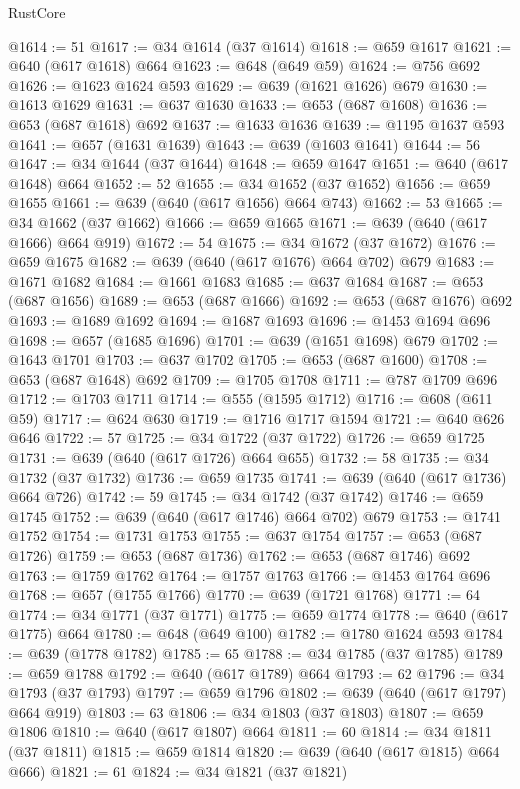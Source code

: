 \begin{lexlean}{RustCore}
\begin{coremodule}
@1614 := 51
@1617 := @34 @1614 (@37 @1614)
@1618 := @659 @1617
@1621 := @640 (@617 @1618) @664
@1623 := @648 (@649 @59)
@1624 := @756 @692
@1626 := @1623 @1624 @593
@1629 := @639 (@1621 @1626) @679
@1630 := @1613 @1629
@1631 := @637 @1630
@1633 := @653 (@687 @1608)
@1636 := @653 (@687 @1618) @692
@1637 := @1633 @1636
@1639 := @1195 @1637 @593
@1641 := @657 (@1631 @1639)
@1643 := @639 (@1603 @1641)
@1644 := 56
@1647 := @34 @1644 (@37 @1644)
@1648 := @659 @1647
@1651 := @640 (@617 @1648) @664
@1652 := 52
@1655 := @34 @1652 (@37 @1652)
@1656 := @659 @1655
@1661 := @639 (@640 (@617 @1656) @664 @743)
@1662 := 53
@1665 := @34 @1662 (@37 @1662)
@1666 := @659 @1665
@1671 := @639 (@640 (@617 @1666) @664 @919)
@1672 := 54
@1675 := @34 @1672 (@37 @1672)
@1676 := @659 @1675
@1682 := @639 (@640 (@617 @1676) @664 @702) @679
@1683 := @1671 @1682
@1684 := @1661 @1683
@1685 := @637 @1684
@1687 := @653 (@687 @1656)
@1689 := @653 (@687 @1666)
@1692 := @653 (@687 @1676) @692
@1693 := @1689 @1692
@1694 := @1687 @1693
@1696 := @1453 @1694 @696
@1698 := @657 (@1685 @1696)
@1701 := @639 (@1651 @1698) @679
@1702 := @1643 @1701
@1703 := @637 @1702
@1705 := @653 (@687 @1600)
@1708 := @653 (@687 @1648) @692
@1709 := @1705 @1708
@1711 := @787 @1709 @696
@1712 := @1703 @1711
@1714 := @555 (@1595 @1712)
@1716 := @608 (@611 @59)
@1717 := @624 @630
@1719 := @1716 @1717 @1594
@1721 := @640 @626 @646
@1722 := 57
@1725 := @34 @1722 (@37 @1722)
@1726 := @659 @1725
@1731 := @639 (@640 (@617 @1726) @664 @655)
@1732 := 58
@1735 := @34 @1732 (@37 @1732)
@1736 := @659 @1735
@1741 := @639 (@640 (@617 @1736) @664 @726)
@1742 := 59
@1745 := @34 @1742 (@37 @1742)
@1746 := @659 @1745
@1752 := @639 (@640 (@617 @1746) @664 @702) @679
@1753 := @1741 @1752
@1754 := @1731 @1753
@1755 := @637 @1754
@1757 := @653 (@687 @1726)
@1759 := @653 (@687 @1736)
@1762 := @653 (@687 @1746) @692
@1763 := @1759 @1762
@1764 := @1757 @1763
@1766 := @1453 @1764 @696
@1768 := @657 (@1755 @1766)
@1770 := @639 (@1721 @1768)
@1771 := 64
@1774 := @34 @1771 (@37 @1771)
@1775 := @659 @1774
@1778 := @640 (@617 @1775) @664
@1780 := @648 (@649 @100)
@1782 := @1780 @1624 @593
@1784 := @639 (@1778 @1782)
@1785 := 65
@1788 := @34 @1785 (@37 @1785)
@1789 := @659 @1788
@1792 := @640 (@617 @1789) @664
@1793 := 62
@1796 := @34 @1793 (@37 @1793)
@1797 := @659 @1796
@1802 := @639 (@640 (@617 @1797) @664 @919)
@1803 := 63
@1806 := @34 @1803 (@37 @1803)
@1807 := @659 @1806
@1810 := @640 (@617 @1807) @664
@1811 := 60
@1814 := @34 @1811 (@37 @1811)
@1815 := @659 @1814
@1820 := @639 (@640 (@617 @1815) @664 @666)
@1821 := 61
@1824 := @34 @1821 (@37 @1821)

\end{coremodule}
\end{lexlean}
